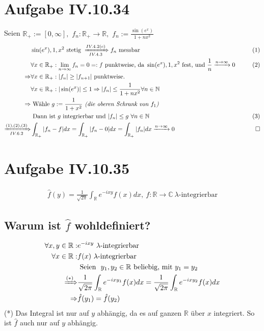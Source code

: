 \documentclass[12pt,a4paper]{article}
\newcommand{\myeq}[1]{\hfill{\refstepcounter{equation}(\theequation)\label{#1}}}
\begin{document}
\pagestyle{fancy}
\fancyhf{}
\rfoot{\thepage}

\section*{Aufgabe IV.10.34}
Seien $\mathbb{R}_+ := [0, \infty],$ $f_n: \mathbb{R_+} \rightarrow \mathbb{R},$ $f_n := \frac{\sin(e^x)}{1+nx^2}$\\
\begin{align*}
	 &\sin(e^x), 1, x^2\text{ stetig }\xRightarrow[IV.4.3]{IV.4.2(c)}f_n \text{ messbar} &\myeq{}\\
	&\forall x \in \mathbb{R_+}: \lim_{n\to\infty} f_n = 0 =: f \text{ punktweise, da } \sin(e^x), 1, x^2 \text{ fest, und } \frac{1}{n} \xrightarrow{n \rightarrow \infty} 0 \ &\myeq{}\\
	\Rightarrow &\forall x \in \mathbb{R_+}: |f_n| \geq |f_{n+1}| \text{ punktweise}.\\
	&\forall x \in \mathbb{R_+}: |\sin(e^x)| \leq 1\Rightarrow |f_n| \leq \frac{1}{1+nx^2} \forall n \in \mathbb{N}\\
	\Rightarrow &\text{ Wähle } g := \frac{1}{1+x^2} \emph{ (die oberen Schrank von $f_1$) }\\& \text{ Dann ist $g$ integrierbar und } |f_n| \leq g \ \forall n \in \mathbb{N} \ &\myeq{} \\
	\xRightarrow[IV.6.2]{(1), (2), (3)} &\int_\mathbb{R_+}|f_n - f|dx = \int_\mathbb{R_+}|f_n - 0|dx = \int_\mathbb{R_+}|f_n|dx \xrightarrow{n \rightarrow \infty} 0 &\qed
\end{align*}
\section*{Aufgabe IV.10.35}
\begin{align*}
\hat{f}(y) = \frac{1}{\sqrt{2\pi}}\int_\mathbb{R} e^{-ixy}f(x)dx, \ f: \mathbb{R} \rightarrow \mathbb{C} \ \lambda\text{-integrierbar}	
\end{align*}
\subsection*{Warum ist $\hat{f}$ wohldefiniert?}
\begin{align*}
	\forall x,y \in \mathbb{R}: & e^{-ixy} \ \lambda\text{-integrierbar}\\ \forall x \in \mathbb{R}: &f(x) \ \lambda\text{-integrierbar}\\
	&\text{ Seien } \ y_1, y_2 \in \mathbb{R}  \text{ beliebig, mit } y_1 = y_2\\
	\xRightarrow{(*)}& \frac{1}{\sqrt{2\pi}}\int_\mathbb{R}e^{-ix{y_1}}f(x)dx = \frac{1}{\sqrt{2\pi}}\int_\mathbb{R}e^{-ix{y_2}}f(x)dx\\
	\Rightarrow &\hat{f}(y_1) = \hat{f}(y_2)
\end{align*}
(*) Das Integral ist nur auf $y$ abhängig, da es auf ganzen $\mathbb{R}$ über $x$ integriert. So ist $\hat{f}$ auch nur auf $y$ abhängig.
\end{document}
